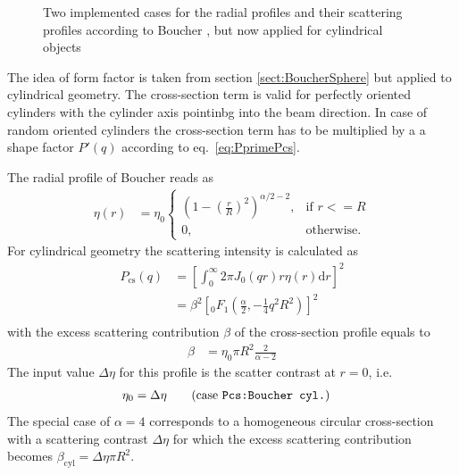 \begin{figure}[htb]
\hfill
{}
\caption{Two implemented cases for the radial profiles and their scattering profiles according to Boucher \cite{Boucher1983}, but now applied for cylindrical objects}
\label{fig:cylBoucherprofilea}
\end{figure}

The idea of form factor is taken from section \ref{sect:BoucherSphere} but applied to cylindrical geometry. The cross-section term is valid for perfectly oriented cylinders with the cylinder axis pointinbg into the beam direction. In case of random oriented cylinders the cross-section term has to be multiplied by a a shape factor $P'(q)$ according to eq.\ \ref{eq:PprimePcs}.

The radial profile of Boucher \cite{Boucher1983} reads as
\begin{align}
\eta(r) &= \eta_0
  \begin{cases}
    \left(1-\left(\frac{r}{R}\right)^2\right)^{\alpha/2-2}, & \mbox{if } r<=R \\
    0, & \mbox{otherwise}.
  \end{cases}
\end{align}
For cylindrical geometry the scattering intensity is calculated as
\begin{align}\label{eq:Pcs_cylBoucher}
  P_\mathrm{cs}(q)&= \left[\int_0^\infty 2\pi J_0(qr)r \eta(r) \mathrm{d}r\right]^2 \nonumber \\
                  &= \beta^2 \left[ {}_0F_1\left(\frac{\alpha}{2},-\frac14q^2R^2\right)\right]^2 \\
\end{align}
with the excess scattering contribution $\beta$ of the cross-section profile equals to
\begin{align}\label{eq:beta_cyl_boucher}
  \beta & = \eta_0\pi R^2 \frac{2}{\alpha-2}
\end{align}
The input value $\Delta\eta$ for this profile is the scatter contrast at $r=0$, i.e.
\begin{align}
\eta_0&=\Delta\eta \qquad \mbox{(case \texttt{Pcs:Boucher cyl.})}
\label{eq:eta0BoucherCyl}
\end{align}
The special case of $\alpha=4$ corresponds to a homogeneous circular cross-section with a scattering contrast $\Delta\eta$ for which the excess scattering contribution becomes $\beta_\mathrm{cyl}=\Delta\eta \pi R^2$.


